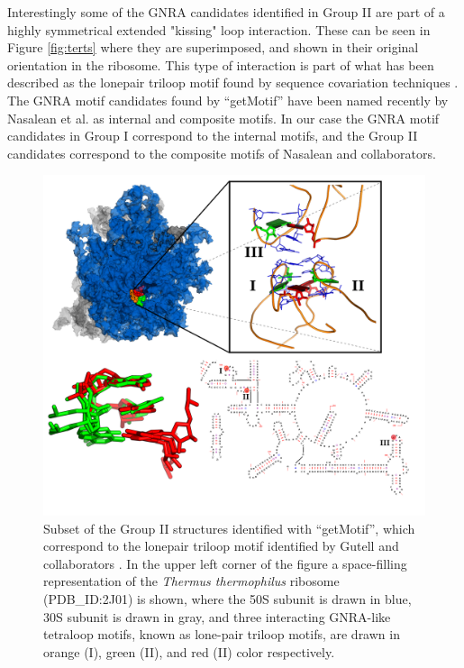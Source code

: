 Interestingly some of  the GNRA candidates identified in  Group II are
part    of   a    highly   symmetrical    extended    "kissing"   loop
interaction. These  can be seen  in Figure \ref{fig:terts}  where they
are  superimposed, and  shown  in their  original  orientation in  the
ribosome. This type of interaction  is part of what has been described
as the lonepair triloop motif found by sequence covariation techniques
\cite{lee2003}.  The GNRA motif  candidates found by ``getMotif'' have
been named recently by Nasalean et al. \cite{nasalean2009} as internal
and composite motifs.  In our  case the GNRA motif candidates in Group
I  correspond to  the internal  motifs,  and the  Group II  candidates
correspond to the composite motifs of Nasalean and collaborators.

\begin{figure}
\centering 
\includegraphics[angle=0, scale=0.34]{Chapter5/lonepairtlooptertF.png}
\caption{Subset   of   the  Group   II   structures  identified   with
  ``getMotif'',  which  correspond   to  the  lonepair  triloop  motif
  identified by Gutell and collaborators \cite{lee2003}.
  In   the  upper   left  corner   of  the   figure   a  space-filling
  representation   of  the   \textit{Thermus   thermophilus}  ribosome
  (PDB\_ID:2J01) is shown, where the 50S subunit is drawn in blue, 30S
  subunit is drawn in  gray, and three interacting GNRA-like tetraloop
  motifs, known as lone-pair triloop  motifs, are drawn in orange (I),
  green (II), and red (II) color respectively.
}
\end{figure}
